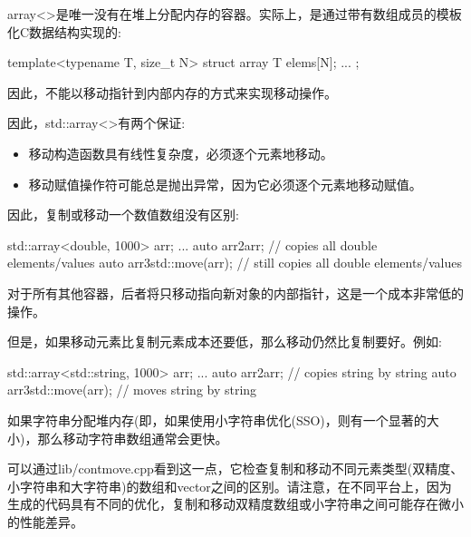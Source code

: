 array<>是唯一没有在堆上分配内存的容器。实际上，是通过带有数组成员的模板化C数据结构实现的:

\begin{cppcode}
template<typename T, size_t N>
struct array {
	T elems[N];
	...
};
\end{cppcode}

因此，不能以移动指针到内部内存的方式来实现移动操作。

因此，std::array<>有两个保证:

\begin{itemize}
	\item 移动构造函数具有线性复杂度，必须逐个元素地移动。
	\item 移动赋值操作符可能总是抛出异常，因为它必须逐个元素地移动赋值。
\end{itemize}

因此，复制或移动一个数值数组没有区别:

\begin{cppcode}
std::array<double, 1000> arr;
...
auto arr2{arr}; // copies all double elements/values
auto arr3{std::move(arr)}; // still copies all double elements/values
\end{cppcode}

对于所有其他容器，后者将只移动指向新对象的内部指针，这是一个成本非常低的操作。

但是，如果移动元素比复制元素成本还要低，那么移动仍然比复制要好。例如:

\begin{cppcode}
std::array<std::string, 1000> arr;
...
auto arr2{arr}; // copies string by string
auto arr3{std::move(arr)}; // moves string by string
\end{cppcode}

如果字符串分配堆内存(即，如果使用小字符串优化(SSO)，则有一个显著的大小)，那么移动字符串数组通常会更快。

可以通过lib/contmove.cpp看到这一点，它检查复制和移动不同元素类型(双精度、小字符串和大字符串)的数组和vector之间的区别。请注意，在不同平台上，因为生成的代码具有不同的优化，复制和移动双精度数组或小字符串之间可能存在微小的性能差异。





















